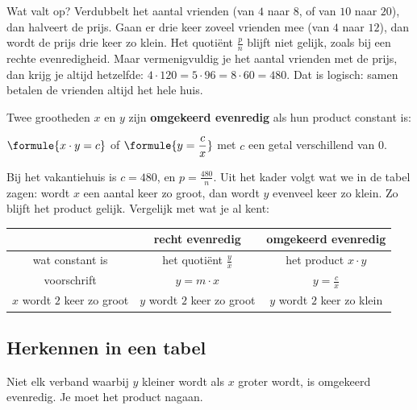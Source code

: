 
Wat valt op? Verdubbelt het aantal vrienden (van $4$ naar $8$, of van $10$ naar $20$), dan halveert de prijs. Gaan er drie keer zoveel vrienden mee (van $4$ naar $12$), dan wordt de prijs drie keer zo klein. Het quotiënt $\tfrac pn$ blijft niet gelijk, zoals bij een rechte evenredigheid. Maar vermenigvuldig je het aantal vrienden met de prijs, dan krijg je altijd hetzelfde: $4 \cdot 120 = 5 \cdot 96 = 8 \cdot 60 = 480$. Dat is logisch: samen betalen de vrienden altijd het hele huis.

\begin{theorie}
Twee grootheden $x$ en $y$ zijn \textbf{\textcolor{accent}{omgekeerd evenredig}} als hun product constant is:

\vspace{1mm}
\qquad $\formule{x \cdot y = c}$ \qquad of \qquad $\formule{y = \dfrac{c}{x}}$ \qquad met $c$ een getal verschillend van 0.
\end{theorie}

Bij het vakantiehuis is $c = 480$, en $p = \tfrac{480}{n}$. Uit het kader volgt wat we in de tabel zagen: wordt $x$ een aantal keer zo groot, dan wordt $y$ evenveel keer zo klein. Zo blijft het product gelijk. Vergelijk met wat je al kent:

{\centering\renewcommand{\arraystretch}{1.45}\begin{tabular}{|c|c|c|}
\hline
 & \textbf{recht evenredig} & \textbf{omgekeerd evenredig} \\ \hline
wat constant is & het quotiënt $\tfrac yx$ & het product $x \cdot y$ \\ \hline
voorschrift & $y = m \cdot x$ & $y = \tfrac cx$ \\ \hline
$x$ wordt $2$ keer zo groot & $y$ wordt $2$ keer zo groot & $y$ wordt $2$ keer zo klein \\ \hline
\end{tabular}\par}

\subsection{Herkennen in een tabel}

Niet elk verband waarbij $y$ kleiner wordt als $x$ groter wordt, is omgekeerd evenredig. Je moet het product nagaan.


